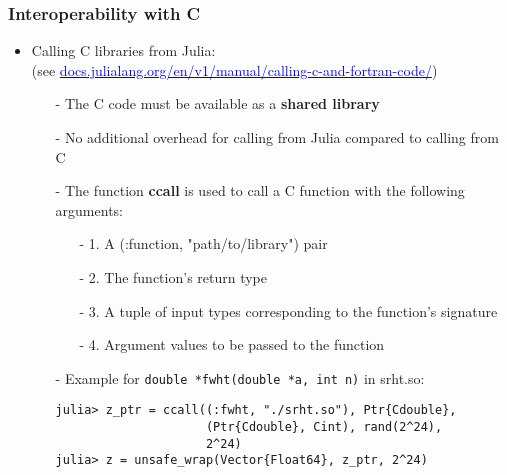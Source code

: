 \documentclass[t,usepdftitle=false]{beamer}
\begin{document}
\begin{frame}[fragile]
\frametitle{Interoperability with C}
\begin{itemize}
\item Calling C libraries from Julia:\vspace{.1cm}\\
(see \href{docs.julialang.org/en/v1/manual/calling-c-and-fortran-code/}{\textcolor{blue}{docs.julialang.org/en/v1/manual/calling-c-and-fortran-code/}})\vspace{.1cm}
\begin{itemize}\normalsize
\item[-] The C code must be available as a \textbf{shared library}\vspace{.1cm}
\item[-] No additional overhead for calling from Julia compared to calling from C\vspace{.1cm}
\item[-] The function \textbf{ccall} is used to call a C function with the following arguments:\vspace{.1cm}
\begin{itemize}\normalsize
\item[-]1. A (:function, "path/to/library") pair\vspace{.1cm}
\item[-]2. The function's return type\vspace{.1cm}
\item[-]3. A tuple of input types corresponding to the function's signature\vspace{.1cm}
\item[-]4. Argument values to be passed to the function\vspace{.1cm}
\end{itemize}
\item[-] Example for \texttt{double *fwht(double *a, int n)} in srht.so:
\begin{verbatim}
julia> z_ptr = ccall((:fwht, "./srht.so"), Ptr{Cdouble}, 
                     (Ptr{Cdouble}, Cint), rand(2^24), 
                     2^24)
julia> z = unsafe_wrap(Vector{Float64}, z_ptr, 2^24)
\end{verbatim}
\end{itemize}
\end{itemize}
\end{frame}  
\end{document}
